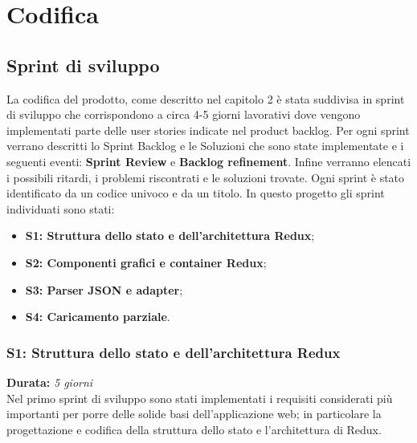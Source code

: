 
\chapter{Codifica}
\label{cap:codifica}

\section{Sprint di sviluppo}
La codifica del prodotto, come descritto nel capitolo 2 è stata suddivisa in sprint di sviluppo che corrispondono a circa 4-5 giorni lavorativi dove vengono implementati parte delle user stories indicate nel product backlog. Per ogni sprint verrano descritti lo Sprint Backlog e le Soluzioni che sono state implementate e i seguenti eventi: \textbf{Sprint Review} e \textbf{Backlog refinement}.
Infine verranno elencati i possibili ritardi, i problemi riscontrati e le soluzioni trovate. Ogni sprint è stato identificato da un codice univoco e da un titolo. In questo progetto gli sprint individuati sono stati:
\begin{itemize}
	\item \textbf{S1: Struttura dello stato e dell'architettura Redux};
	\item \textbf{S2: Componenti grafici e container Redux};
	\item \textbf{S3: Parser JSON e adapter};
	\item \textbf{S4: Caricamento parziale}.
\end{itemize}

\subsection{S1: Struttura dello stato e dell'architettura Redux}
\textbf{Durata:} \textit{5 giorni} \\
Nel primo sprint di sviluppo sono stati implementati i requisiti considerati più importanti per porre delle solide basi dell'applicazione web; in particolare la progettazione e codifica della struttura dello stato e l'architettura di Redux.

